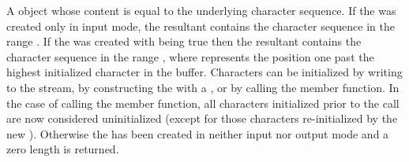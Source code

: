 \documentclass[ebook,11pt,article]{memoir}
\begin{document}
\begin{itemdescr}
\pnum
\returns
A
object whose content is equal to the
underlying character sequence.
If the  was created only in input mode, the resultant
 contains the character sequence in the range
. If the  was created with
 being true then the resultant 
contains the character sequence in the range , where
 represents the position one past the highest initialized character
in the buffer. Characters can be initialized by writing to the stream, by constructing
the  with a , or by calling 
the
 member function. In the case of calling 
the
 member function, all characters initialized prior to
the call are now considered uninitialized (except for those characters re-initialized
by the new ). Otherwise the  has been created
in neither input nor output mode and a zero length  is returned. 
\end{itemdescr}
\end{document}
